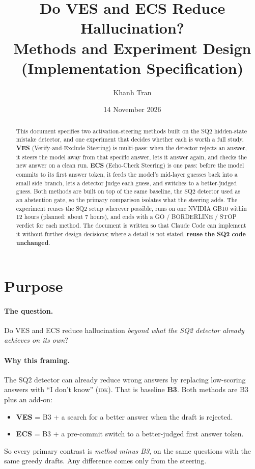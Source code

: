 \documentclass[11pt]{article}
\title{Do VES and ECS Reduce Hallucination?\\[2pt]
\large Methods and Experiment Design (Implementation Specification)}
\author{Khanh Tran}
\date{14 November 2026}
\newcommand{\IDK}{\textsc{idk}}
\begin{document}
\maketitle

\begin{abstract}
\noindent
This document specifies two activation-steering methods built on the SQ2 hidden-state mistake detector,
and one experiment that decides whether each is worth a full study. \textbf{VES} (Verify-and-Exclude
Steering) is multi-pass: when the detector rejects an answer, it steers the model away from that specific
answer, lets it answer again, and checks the new answer on a clean run. \textbf{ECS} (Echo-Check Steering)
is one pass: before the model commits to its first answer token, it feeds the model's mid-layer guesses back
into a small side branch, lets a detector judge each guess, and switches to a better-judged guess. Both
methods are built on top of the same baseline, the SQ2 detector used as an abstention gate, so the primary
comparison isolates what the steering adds. The experiment reuses the SQ2 setup wherever possible, runs on
one NVIDIA GB10 within 12 hours (planned: about 7 hours), and ends with a GO / BORDERLINE / STOP verdict
for each method. The document is written so that Claude Code can implement it without further design
decisions; where a detail is not stated, \textbf{reuse the SQ2 code unchanged}.
\end{abstract}

\section{Purpose}

\paragraph{The question.} Do VES and ECS reduce hallucination \emph{beyond what the SQ2 detector already
achieves on its own}?

\paragraph{Why this framing.} The SQ2 detector can already reduce wrong answers by replacing low-scoring
answers with ``I don't know'' (\IDK). That is baseline \textbf{B3}. Both methods are B3 plus an add-on:
\begin{itemize}
  \item \textbf{VES} = B3 + a search for a better answer when the draft is rejected.
  \item \textbf{ECS} = B3 + a pre-commit switch to a better-judged first answer token.
\end{itemize}
So every primary contrast is \emph{method minus B3}, on the same questions with the same greedy drafts.
Any difference comes only from the steering.
\end{document}
